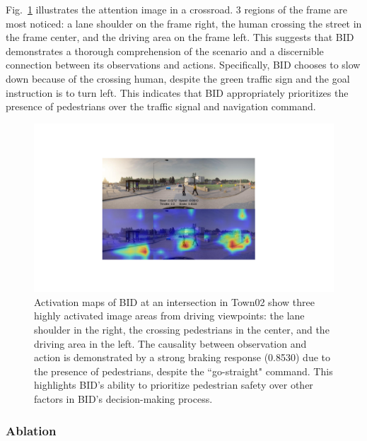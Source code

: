 Fig.~\ref{fig:attention_ped_greed} illustrates the attention image in a crossroad. 
3 regions of the frame are most noticed: a lane shoulder on the frame right, the human crossing the street in the frame center, and the driving area on the frame left. 
This suggests that BID demonstrates a thorough comprehension of the scenario and a discernible connection between its observations and actions. 
Specifically, BID chooses to slow down because of the crossing human, despite the green traffic sign and the goal instruction is to turn left. 
This indicates that BID appropriately prioritizes the presence of pedestrians over the traffic signal and navigation command.


\begin{figure}[ht!]
	\centering
	\includegraphics[width=\linewidth]{fig/attention_ped_greed.pdf}
	\caption{Activation maps of BID at an intersection in Town02 show three highly activated image areas from driving viewpoints: 
		the lane shoulder in the right, the crossing pedestrians in the center, and the driving area in the left. 
		The causality between observation and action is demonstrated by a strong braking response (0.8530) due to the presence of pedestrians, despite the ``go-straight" command. 
		This highlights BID's ability to prioritize pedestrian safety over other factors in BID's decision-making process. }
	\label{fig:attention_ped_greed}
\end{figure}



\subsubsection{Ablation}

